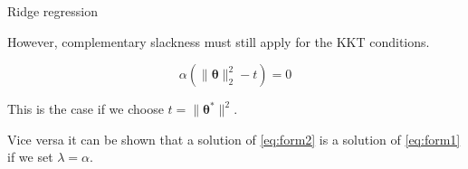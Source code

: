 \documentclass[11pt,compress,t,notes=noshow, xcolor=table]{beamer}
\begin{document}
\begin{vbframe}{Ridge regression}
\lz

However, complementary slackness must still apply for the KKT conditions.

$$
\alpha(\|\bm{\theta}\|^2_2 - t) = 0
$$

This is the case if we choose $t = \|\bm{\theta}^*\|^2$.

\lz

Vice versa it can be shown that a solution of \eqref{eq:form2} is a solution of \eqref{eq:form1} if we set $\lambda = \alpha$.



\framebreak


%
%
%
%
%




\end{vbframe}

\endlecture
\end{document}
